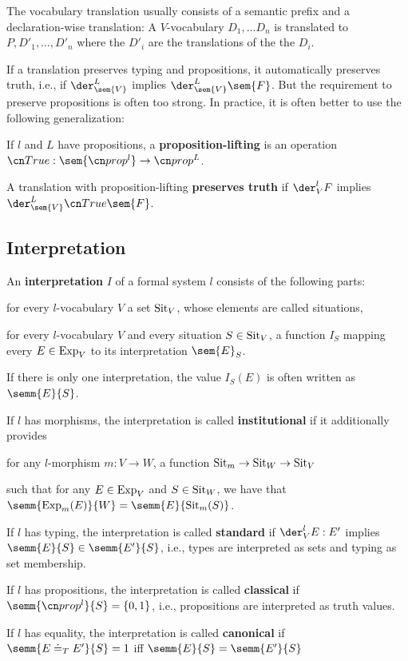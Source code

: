 The vocabulary translation usually consists of a semantic prefix and a declaration-wise translation: A $V$-vocabulary $D_1,\ldots D_n$ is translated to $P,D'_1,\ldots,D'_n$ where the $D'_i$ are the translations of the the $D_i$.

If a translation preserves typing and propositions, it automatically preserves truth, i.e., if $\der^L_{\sem{V}}$ implies $\der^L_{\sem{V}}\sem{F}$.
But the requirement to preserve propositions is often too strong.
In practice, it is often better to use the following generalization:
\begin{definition}
If $l$ and $L$ have propositions, a \textbf{proposition-lifting} is an operation $\truelift:\sem{\prop^l}\to\prop^L$.

A translation with proposition-lifting \textbf{preserves truth} if $\der^l_V F$ implies $\der^L_{\sem{V}}\truelift\sem{F}$.
\end{definition}

\subsection{Interpretation}

\begin{definition}
An \textbf{interpretation} $I$ of a formal system $l$ consists of the following parts:
\begin{compactitem}
 \item for every $l$-vocabulary $V$ a set $\mathrm{Sit}_V$, whose elements are called situations,
 \item for every $l$-vocabulary $V$ and every situation $S\in \mathrm{Sit}_V$, a function $I_S$ mapping every $E\in \mathrm{Exp}_V$ to its interpretation $\sem{E}_S$.
\end{compactitem}
If there is only one interpretation, the value $I_S(E)$ is often written as $\semm{E}{S}$.

If $l$ has morphisms, the interpretation is called \textbf{institutional} if it additionally provides
\begin{compactitem}
 \item for any $l$-morphism $m:V\to W$, a function $\mathrm{Sit}_m\to \mathrm{Sit}_W\to \mathrm{Sit}_V$
 \item such that for any $E\in\mathrm{Exp}_V$ and $S\in \mathrm{Sit}_W$, we have that $\semm{\Exp_m(E)}{W} = \semm{E}{\Sit_m(S)}$.
\end{compactitem}

If $l$ has typing, the interpretation is called \textbf{standard} if $\der^l_V E:E'$ implies $\semm{E}{S}\in \semm{E'}{S}$, i.e., types are interpreted as sets and typing as set membership.

If $l$ has propositions, the interpretation is called \textbf{classical} if $\semm{\prop^l}{S}=\{0,1\}$, i.e., propositions are interpreted as truth values.

If $l$ has equality, the interpretation is called \textbf{canonical} if $\semm{E\doteq_T E'}{S}=1$ iff $\semm{E}{S}=\semm{E'}{S}$
\end{definition}

